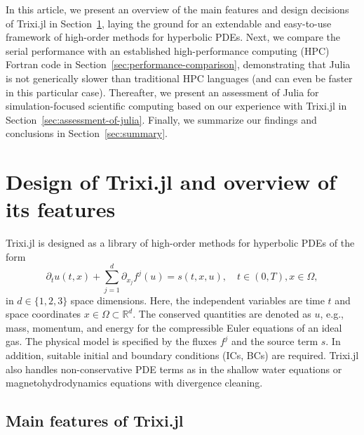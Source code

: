 \documentclass{juliacon}
\makeatletter
\newcommand{\eg}[0]{{e.g.\@}\xspace}
\newcommand{\trixi}{Trixi.jl\xspace}
\makeatother
\begin{document}
In this article, we present an overview of the main features and design decisions
of \trixi in Section~\ref{sec:design-of-trixi}, laying the ground for an extendable
and easy-to-use framework of high-order methods for hyperbolic PDEs. Next, we
compare the serial performance with an established high-performance computing (HPC) Fortran code in
Section~\ref{sec:performance-comparison}, demonstrating that Julia is not generically
slower than traditional HPC languages (and can even be faster in this particular case).
Thereafter, we present an assessment of Julia for simulation-focused scientific
computing based on our experience with \trixi in Section~\ref{sec:assessment-of-julia}.
Finally, we summarize our findings and conclusions in Section~\ref{sec:summary}.



\section{Design of \trixi and overview of its features}
\label{sec:design-of-trixi}

\trixi is designed as a library of high-order methods for hyperbolic PDEs of
the form
\begin{equation}
\label{eq:hcl}
  \partial_t u(t, x) + \sum_{j=1}^d \partial_{x_j} f^j(u) = s(t, x, u),
  \quad t \in (0, T), x \in \Omega,
\end{equation}
in $d \in \{1, 2, 3\}$ space dimensions. Here, the independent variables are
time $t$ and space coordinates $x \in \Omega \subset \mathbb{R}^d$. The conserved
quantities are denoted as $u$, \eg, mass, momentum, and energy for the compressible
Euler equations of an ideal gas.
The physical model is specified by the fluxes $f^j$ and the source term $s$.
In addition, suitable initial and boundary conditions (ICs, BCs) are required.
\trixi also handles non-conservative PDE terms as in the shallow water equations or magnetohydrodynamics equations
with divergence cleaning.


\subsection{Main features of \trixi}
\end{document}
